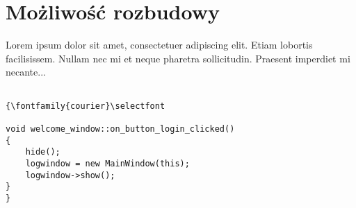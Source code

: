\documentclass{article}
\begin{document}
\section{Możliwość rozbudowy}
 
Lorem ipsum dolor sit amet, consectetuer adipiscing elit.  
Etiam lobortis facilisissem.  Nullam nec mi et neque pharetra 
sollicitudin.  Praesent imperdiet mi necante...
 



\begin{tcolorbox}
\begin{lstlisting}

{\fontfamily{courier}\selectfont

void welcome_window::on_button_login_clicked()
{
    hide();
    logwindow = new MainWindow(this);
    logwindow->show();
}
}

\end{lstlisting}
\end{tcolorbox}
\end{document}
